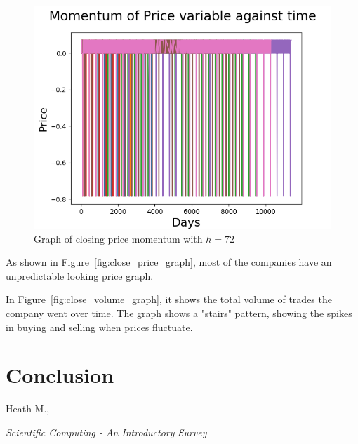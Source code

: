 \documentclass[8pt]{article}
\begin{document}
	\begin{figure}[h]
		\centering
		\includegraphics{all_momentum_step_7.png}
		\caption{Graph of closing price momentum with $h=72$}
		\label{fig:close_m7_graph}
	\end{figure}

	As shown in Figure~\ref{fig:close_price_graph}, most of the companies have an unpredictable looking price graph.

	In Figure~\ref{fig:close_volume_graph}, it shows the total volume of trades the company went over time.
	The graph shows a "stairs" pattern, showing the spikes in buying and selling when prices fluctuate.

	\section{Conclusion}
	\begin{thebibliography}{9}
			Heath M.,

			\textit{Scientific Computing - An Introductory Survey}
	\end{thebibliography}
\end{document}
